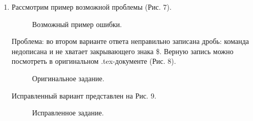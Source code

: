 \documentclass[11pt, a4paper]{extarticle}
\newcommand{\code}[1]{{\color{blue} #1}}
\newcommand{\form}[1]{{\color{magenta} #1}}
\begin{document}
\begin{enumerate}
	\item Рассмотрим пример возможной проблемы (Рис. 7).
	
	\begin{figure}[h!]
		\centering
		\caption{Возможный пример ошибки.}
	\end{figure}

	Проблема: во втором варианте ответа неправильно записана дробь: команда недописана и не хватает закрывающего знака \code{\$}. Верную запись можно посмотреть в оригинальном \form{.tex}-документе (Рис. 8).
	
	\begin{figure}[h!]
		\centering
		\caption{Оригинальное задание.}
	\end{figure}

	Исправленный вариант представлен на Рис. 9.
	
	\begin{figure}[h!]
		\centering
		\caption{Исправленное задание.}
	\end{figure}


\end{enumerate}
\end{document}
